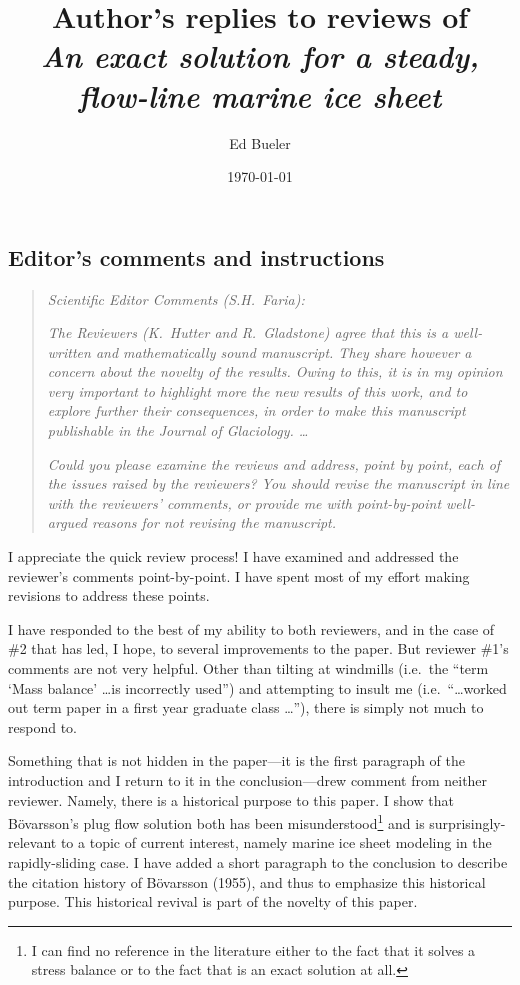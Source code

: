 \documentclass[11pt,reqno]{amsart}
\title[Author's replies to reviews of \emph{An exact solution \dots}]{Author's replies to reviews of \\ \emph{An exact solution for a steady, flow-line marine ice sheet}}
\author{Ed Bueler}
\date{\today}
\renewcommand{\dh}{\fontencoding{T1}\selectfont{\symbol{240}}}
\newcommand{\bod}{B\"o\dh varsson\xspace}
\newcommand{\citebod}{B\"o\dh varsson (1955)\xspace}
\begin{document}
\maketitle

\thispagestyle{empty}



\subsection*{Editor's comments and instructions}  \begin{quote}
\emph{Scientific Editor Comments (S.H.~Faria):}

\emph{The Reviewers (K.~Hutter and R.~Gladstone) agree that this is a well-written and mathematically sound manuscript. They share however a concern about the novelty of the results. Owing to this, it is in my opinion very important to highlight more the new results of this work, and to explore further their consequences, in order to make this manuscript publishable in the Journal of Glaciology.  \dots}

\emph{Could you please examine the reviews and address, point by point, each of the issues raised by the reviewers? You should revise the manuscript in line with the reviewers' comments, or provide me with point-by-point well-argued reasons for not revising the manuscript.}
\end{quote}

\medskip
\noindent I appreciate the quick review process!  I have examined and addressed the reviewer's comments point-by-point.  I have spent most of my effort making revisions to address these points.

\medskip
\noindent I have responded to the best of my ability to both reviewers, and in the case of \#2 that has led, I hope, to several improvements to the paper.  But reviewer \#1's comments are not very helpful.  Other than tilting at windmills (i.e.~the ``term `Mass balance' \dots is incorrectly used'') and attempting to insult me (i.e.~``\dots worked out term paper in a first year graduate class \dots''), there is simply not much to respond to.

\medskip
\noindent Something that is not hidden in the paper---it is the first paragraph of the introduction and I return to it in the conclusion---drew comment from neither reviewer.  Namely, there is a historical purpose to this paper.  I show that \bod's plug flow solution both has been misunderstood\footnote{I can find no reference in the literature either to the fact that it solves a stress balance or to the fact that is an exact solution at all.} and is surprisingly-relevant to a topic of current interest, namely marine ice sheet modeling in the rapidly-sliding case.  I have added a short paragraph to the conclusion to describe the citation history of \citebod, and thus to emphasize this historical purpose.  This historical revival is part of the novelty of this paper.
\end{document}
